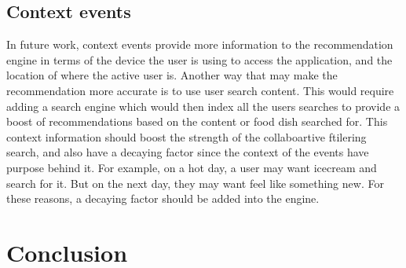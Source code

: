 \subsection{Context events}
In future work, context events provide more information to the recommendation engine in terms of the device the user is using to access the application, and the location of where the active user is. Another way that may make the recommendation more accurate is to use user search content. This would require adding a search engine which would then index all the users searches to provide a boost of recommendations based on the content or food dish searched for. This context information should boost the strength of the collaboartive ftilering search, and also have a decaying factor since the context of the events have purpose behind it. For example, on a hot day, a user may want icecream and search for it. But on the next day, they may want feel like something new. For these reasons, a decaying factor should be added into the engine.

\section{Conclusion}